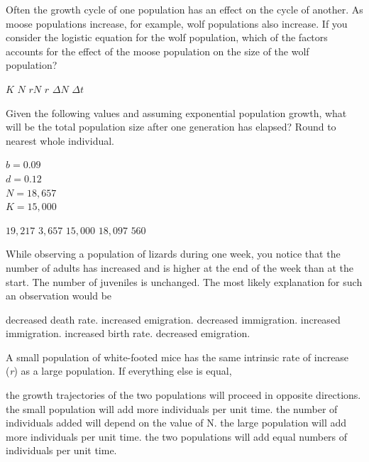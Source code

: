 \question
Often the growth cycle of one population has an effect on the cycle of another. As moose populations increase, for example, wolf populations also increase. If you consider the logistic equation for the wolf population, which of the factors accounts for the effect of the moose population on the size of the wolf population?

\begin{choices}
\correctchoice $K$
\choice $N$
\choice $rN$
\choice $r$
\choice $\Delta N$
\choice $\Delta t$
\end{choices}

\question
Given the following values and assuming exponential population growth, what will be the total population size after one generation has elapsed? Round to nearest whole individual.\vspace{1ex}

\begin{minipage}{1em}
\end{minipage}%
\hspace{2em}%
\begin{minipage}{1.5in}
$b = 0.09$ \\
$d = 0.12$ \\
$N = 18,657$\\
$K = 15,000$\\
\end{minipage}

\begin{choices}
\choice $19,217$
\choice $3,657$
\choice $15,000$
\correctchoice $18,097$
\choice $560$
\end{choices}


\question
While observing a population of lizards during one week, you notice that the number of adults has increased and is higher at the end of the week than at the start. The number of juveniles is unchanged. The most likely explanation for such an observation would be 

\begin{choices}
\choice decreased death rate. 
\choice increased emigration.  
\choice decreased immigration. 
\correctchoice increased immigration.  
\choice increased birth rate.  
\choice decreased emigration.  
\end{choices}


\question
A small population of white-footed mice has the same intrinsic rate of increase (\textit{r}) as a large population.  If everything else is equal, 

\begin{choices}
\choice the growth trajectories of the two populations will proceed in opposite directions. 
\choice the small population will add more individuals per unit time. 
\choice the number of individuals added will depend on the value of N. 
\correctchoice the large population will add more individuals per unit time.  
\choice the two populations will add equal numbers of individuals per unit time.
\end{choices}

